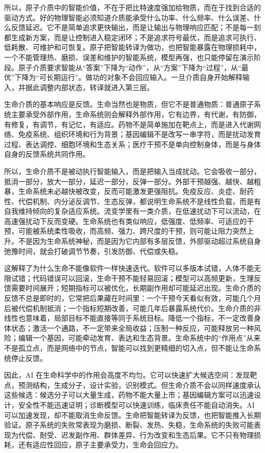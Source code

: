 所以，原子介质中的智能价值，不在于把比特速度强加给物质，而在于找到合适的驱动方式。好的物理智能必须知道介质能承受什么功率、什么频率、什么误差、什么反馈延迟。它不是简单追求更快输出，而是让输出与物理响应匹配；不是每一刻都生成新方案，而是让控制进入稳定闭环；不是追求符号最优，而是追求可执行、低耗散、可维护和可恢复。原子把智能转译为做功，也把智能暴露在物理损耗中，一个不能管理热、磨损、误差和维护的智能系统，模型再强，也只能停留在演示阶段。原子介质要求智能从“答案”下降为“动作”，从“方案”下降为“过程”，从“最优”下降为“可长期运行”。做功的对象不会回应输入。一旦介质自身开始解释输入，并据此调整内部状态，转译就进入第三层。


生命介质的基本响应是反馈。生命当然也是物质，但它不是普通物质：普通原子系统主要承受外部作用，生命系统则会解释外部作用，它有边界，有代谢，有防御，有修复，有调节，有记忆，有适应。药物不是简单施加在靶点上，而是进入代谢网络、免疫系统、组织环境和行为背景；基因编辑不是改写一串字符，而是扰动发育过程、表达调控、细胞环境和生态关系；医疗干预不是单向控制身体，而是与身体自身的反馈系统共同作用。

所以，生命介质不是被动执行智能输入，而是把输入当成扰动。它会吸收一部分，抵消一部分，放大一部分，延迟一部分，反弹一部分。外部干预越强、越快、越粗暴，生命系统未必越快被改变，反而可能激发更强阻抗。免疫反应、炎症、耐药性、代偿机制、内分泌反调节、生态反弹，都说明生命系统不是线性负载，而是有自我维持倾向的复杂适应系统。流变学里有一类介质，在低速扰动下可以流动，在高速强扰动下反而变硬\cite{brown2014shear}。生命系统也有类似响应，低强度、低频率、可适应的干预，可能被系统柔性吸收，而高频、强力、跨尺度的干预，则可能让阻力突然上升。不是因为生命系统神秘，而是因为它内部有多层反馈，外部驱动超过系统自身弛豫时间，就会打破调节节奏，引发防御、代偿或失稳。

这解释了为什么生命不能像软件一样快速迭代。软件可以多版本试错，人体不能无限试错；代码错误可以回滚，生命干预不能轻易回滚；模型可以高频更新，生理反馈需要时间展开；短期指标可以被优化，长期副作用却可能延迟出现。生命介质的反馈不总是即时的，它常把后果藏在时间里：一个干预今天看似有效，可能几个月后被代偿机制抵消；一个指标短期改善，可能几年后暴露系统代价。生命介质的非线性也意味着，局部目标不能直接等同于系统目标。降低一个指标，不一定改善身体状态；激活一个通路，不一定带来全局收益；压制一种反应，可能释放另一种风险；编辑一个基因，可能牵动发育、表达和生态背景。生命系统中的“作用点”从来不是孤立点，而是网络中的节点，智能可以找到更精细的切入点，但不能让生命系统停止反馈。

因此，AI 在生命科学中的作用会高度不均匀。它可以快速扩大候选空间：发现靶点，预测结构，生成分子，设计实验，识别模式。但生命介质不会以同样速度承认这些候选：候选分子可以大量生成，药物不能大量上市；基因编辑方案可以迅速设计，安全性不能迅速证明；诊断模型可以快速训练，临床责任不能自动消失。AI 可以加速发现，却不能取消生命反馈。生命把智能转译为反馈，也把智能推入长期验证。原子系统的失败常表现为磨损、断裂、发热、失稳，生命系统的失败可能表现为代偿、耐受、迟发副作用、群体差异、行为改变和生态后果。它不只有物理损耗，还有适应性回应，原子主要承受力，生命会回应力。

